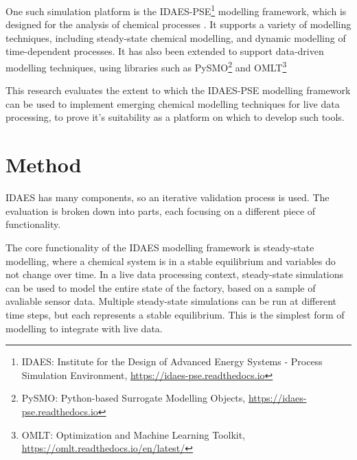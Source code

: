 \documentclass[12pt]{article}
\begin{document}
One such simulation platform is the IDAES-PSE\footnote{IDAES: Institute for the Design of Advanced Energy Systems - Process Simulation Environment, \href{https://idaes-pse.readthedocs.io}{https://idaes-pse.readthedocs.io}} modelling framework, which is designed for the analysis of chemical processes \cite{lee2021idaes}. It supports a variety of modelling techniques, including steady-state chemical modelling, and dynamic modelling of time-dependent processes. 
It has also been extended to support data-driven modelling techniques, using libraries such as PySMO\footnote{PySMO: Python-based Surrogate Modelling Objects, \href{https://idaes-pse.readthedocs.io/en/stable/explanations/modeling_extensions/surrogate/api/pysmo/index.html}{https://idaes-pse.readthedocs.io}} and OMLT\footnote{OMLT: Optimization and Machine Learning Toolkit, \href{https://omlt.readthedocs.io/en/latest/}{https://omlt.readthedocs.io/en/latest/}} \cite{cecconOMLTOptimizationMachine2022} 

This research evaluates the extent to which the IDAES-PSE modelling framework can be used to implement emerging chemical modelling techniques for live data processing, to prove it's suitability as a platform on which to develop such tools.

\section{Method}

IDAES has many components, so an iterative validation process is used. The evaluation is broken down into parts, each focusing on a different piece of functionality. 

The core functionality of the IDAES modelling framework is steady-state modelling, where a chemical system is in a stable equilibrium and variables do not change over time. In a live data processing context, steady-state simulations can be used to model the entire state of the factory, based on a sample of avaliable sensor data. Multiple steady-state simulations can be run at different time steps, but each represents a stable equilibrium. This is the simplest form of modelling to integrate with live data. 
\end{document}
